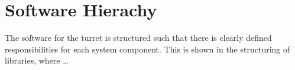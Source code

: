 \section{Software Hierachy}
The software for the \name turret is structured such that there is clearly
defined responsibilities for each system component. This is shown in the
structuring of libraries, where \ldots {}
